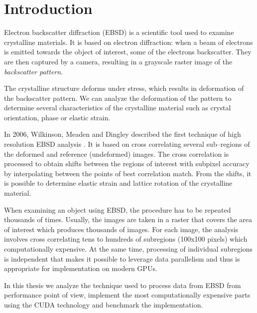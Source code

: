 \chapter*{Introduction}
Electron backscatter diffraction (EBSD) is a scientific tool used to examine crystalline materials. It is based on electron diffraction: when a beam of electrons is emitted towards the object of interest, some of the electrons backscatter. They are then captured by a camera, resulting in a grayscale raster image of the \emph{backscatter pattern}.

The crystalline structure deforms under stress, which results in deformation of the backscatter pattern. We can analyze the deformation of the pattern to determine several characteristics of the crystalline material such as crystal orientation, phase or elastic strain.

In 2006, Wilkinson, Meaden and Dingley described the first technique of high resolution EBSD analysis \cite{wilkinson2006high}. It is based on cross correlating several sub--regions of the deformed and reference (undeformed) images. The cross correlation is processed to obtain shifts between the regions of interest with subpixel accuracy by interpolating between the points of best correlation match. From the shifts, it is possible to determine elastic strain and lattice rotation of the crystalline material.

When examining an object using EBSD, the procedure has to be repeated thousands of times. Usually, the images are taken in a raster that covers the area of interest which produces thousands of images. For each image, the analysis involves cross correlating tens to hundreds of subregions (100x100 pixels) which computationally expensive. At the same time, processing of individual subregions is independent that makes it possible to leverage data parallelism and thus is appropriate for implementation on modern GPUs. 

In this thesis we analyze the technique used to process data from EBSD from performance point of view, implement the most computationally expensive parts using the CUDA technology and benchmark the implementation. 
